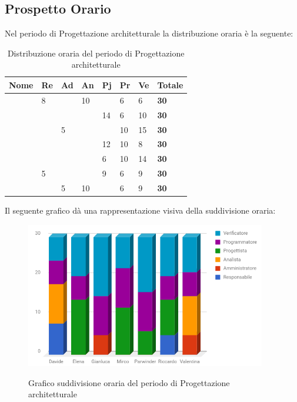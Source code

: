 \documentclass[PianoDiProgetto.tex]{subfiles}
\begin{document}
\subsection{Prospetto Orario}
Nel periodo di Progettazione architetturale la distribuzione oraria è la seguente:
\begin{center}
\begin{table}[htbp]
	\centering
	\renewcommand\arraystretch{1.5}
	\begin{tabularx}{\textwidth}{p{4cm}|p{1cm}|p{1cm}|p{1cm}|p{1cm}|p{1cm}|p{1cm}|p{2cm}}
		\hline
		\textbf{Nome} & \textbf{Re} & \textbf{Ad} & \textbf{An} & \textbf{Pj} & \textbf{Pr} & \textbf{Ve} & \textbf{Totale} \\
		\hline
		\Davide & 8 & \ & 10 & \ & 6 & 6 & \textbf{30} \\
		\hline
		\Elena & \ & \ & \ & 14 & 6 & 10 & \textbf{30} \\
		\hline
		\Gianluca & \ & 5 & \ & \ & 10 & 15 & \textbf{30} \\
		\hline
		\Mirco & \ & \ & \ & 12 & 10 & 8 & \textbf{30} \\
		\hline
		\Parwinder & \ & \ & \ & 6 & 10 & 14 & \textbf{30} \\
		\hline
		\Riccardo & 5 & \ & \ & 9 & 6 & 9 & \textbf{30} \\
		\hline
		\Valentina & \ & 5 & 10 & \ & 6 & 9 & \textbf{30} \\
		\hline
	\end{tabularx}
	\caption{Distribuzione oraria del periodo di Progettazione architetturale}
	\label{my-label}
\end{table}
\end{center}
Il seguente grafico dà una rappresentazione visiva della suddivisione oraria:
\begin{figure}[h]
	\centering
	\includegraphics[width=10.5cm]{images/prospettoOrario/progArch.png}
	\label{fig:foo}
	\caption{Grafico suddivisione oraria del periodo di Progettazione architetturale}
\end{figure} 
\newpage
\end{document}
